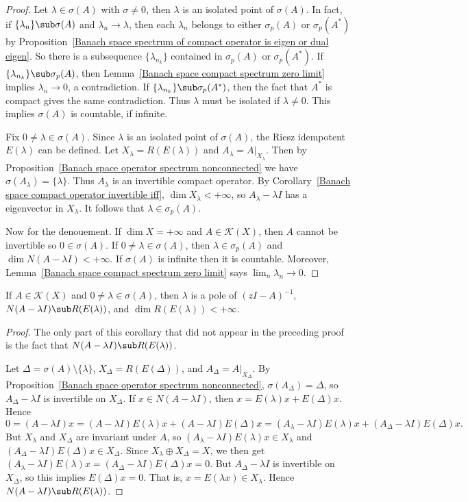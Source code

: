 \begin{proof}
Let $\lambda\in\sigma(A)$ with $\sigma\neq 0$, then $\lambda$ is an isolated point of $\sigma(A)$. In fact, if $\{\lambda_n\}\sub\sigma(A)$ and $\lambda_n\to\lambda$, then each $\lambda_n$ belongs to either $\sigma_p(A)$ or $\sigma_p(A^*)$ by Proposition~\ref{Banach space spectrum of compact operator is eigen or dual eigen}. So there is a subsequence $\{\lambda_{n_k}\}$ contained in $\sigma_p(A)$ or $\sigma_p(A^*)$. If $\{\lambda_{n_k}\}\sub\sigma_p(A)$, then Lemma~\ref{Banach space compact spectrum zero limit} implies $\lambda_n\to 0$, a contradiction. If $\{\lambda_{n_k}\}\sub\sigma_p(A^*)$, then the fact that $A^*$ is compact gives the same contradiction. Thus $\lambda$ must be isolated if $\lambda\neq 0$. This implies $\sigma(A)$ is countable, if infinite.\par
Fix $0\neq\lambda\in\sigma(A)$. Since $\lambda$ is an isolated point of $\sigma(A)$, the Riesz idempotent $E(\lambda)$ can be defined. Let $X_\lambda=R(E(\lambda))$ and $A_\lambda=A|_{X_\lambda}$. Then by Proposition~\ref{Banach space operator spectrum nonconnected} we have $\sigma(A_\lambda)=\{\lambda\}$. Thus $A_\lambda$ is an invertible compact operator. By Corollary~\ref{Banach space compact operator invertible iff}, $\dim X_\lambda<+\infty$, so $A_\lambda-\lambda I$ has a eigenvector in $X_\lambda$. It follows that $\lambda\in\sigma_p(A)$.\par
Now for the denouement. If $\dim X=+\infty$ and $A\in\mathcal{K}(X)$, then $A$ cannot be invertible so $0\in\sigma(A)$. If $0\neq\lambda\in\sigma(A)$, then $\lambda\in\sigma_p(A)$ and $\dim N(A-\lambda I)<+\infty$. If $\sigma(A)$ is infinite then it is countable. Moreover, Lemma~\ref{Banach space compact spectrum zero limit} says $\lim_n\lambda_n\to 0$.
\end{proof}
\begin{corollary}\label{Banach space compact operator eigenspace prop}
If $A\in\mathcal{K}(X)$ and $0\neq\lambda\in\sigma(A)$, then $\lambda$ is a pole of $(zI-A)^{-1}$, $N(A-\lambda I)\sub R(E(\lambda))$, and $\dim R(E(\lambda))<+\infty$.
\end{corollary}
\begin{proof}
The only part of this corollary that did not appear in the preceding proof is the fact that $N(A-\lambda I)\sub R(E(\lambda))$.\par
Let $\Delta=\sigma(A)\setminus\{\lambda\}$, $X_\Delta=R(E(\Delta))$, and $A_\Delta=A|_{X_\Delta}$. By Proposition~\ref{Banach space operator spectrum nonconnected}, $\sigma(A_\Delta)=\Delta$, so $A_\Delta-\lambda I$ is invertible on $X_\Delta$. If $x\in N(A-\lambda I)$, then $x=E(\lambda)x+E(\Delta)x$. Hence
\[0=(A-\lambda I)x=(A-\lambda I)E(\lambda)x+(A-\lambda I)E(\Delta)x=(A_\lambda-\lambda I)E(\lambda)x+(A_\Delta-\lambda I)E(\Delta)x.\]
But $X_\lambda$ and $X_\Delta$ are invariant under $A$, so $(A_\lambda-\lambda I)E(\lambda)x\in X_\lambda$ and $(A_\Delta-\lambda I)E(\Delta)x\in X_\Delta$. Since $X_\lambda\oplus X_\Delta=X$, we then get $(A_\lambda-\lambda I)E(\lambda)x=(A_\Delta-\lambda I)E(\Delta)x=0$. But $A_\Delta-\lambda I$ is invertible on $X_\Delta$, so this implies $E(\Delta)x=0$. That is, $x=E(\lambda x)\in X_\lambda$. Hence $N(A-\lambda I)\sub R(E(\lambda))$.
\end{proof}
